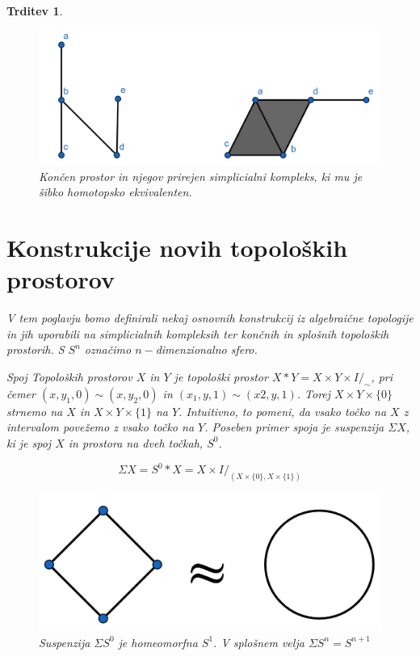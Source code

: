 \documentclass[a4paper,12pt]{article}
\theoremstyle{definition}
\theoremstyle{plain}
\theoremstyle{definition}
\theoremstyle{plain}
\newtheorem{trditev}{Trditev}
\theoremstyle{plain}
\theoremstyle{plain}
\theoremstyle{plain}
\begin{document}
\begin{trditev}
\begin{figure}[h]
    \centering
    \includegraphics[width=1\linewidth]{simp.png}
    \caption{Končen prostor in njegov prirejen simplicialni kompleks, ki mu je šibko homotopsko ekvivalenten.}
\end{figure}


\section{Konstrukcije novih topoloških prostorov}


V tem poglavju bomo definirali nekaj osnovnih konstrukcij iz algebraične topologije in jih uporabili na simplicialnih kompleksih ter končnih in splošnih topoloških prostorih. S $S^n$ označimo $n-$dimenzionalno sfero.

\textit{Spoj} Topoloških prostorov $X$ in $Y$ je topološki prostor $X\ast Y = X\times Y 
\times I /_{\sim}$, pri čemer $(x, y_1, 0) \sim (x, y_2, 0)$ in  $(x_1, y, 1) \sim (x2, y, 1)$. 
Torej $X\times Y\times \{0\}$ strnemo na $X$ in $X\times Y\times \{1\}$ na $Y$. Intuitivno, 
to pomeni, da vsako točko na $X$ z intervalom povežemo z vsako točko na $Y$.
Poseben primer spoja je \textit{suspenzija} $\Sigma X$, ki je spoj $X$ in prostora na dveh točkah, $S^0$.

$$
\Sigma X=S^0\ast X = X\times I /_{(X\times \{0\},X\times \{1\})}
$$

\begin{figure}[h]
    \centering
    \includegraphics[width=0.6\linewidth]{homeo2.png}
    \caption{Suspenzija $\Sigma S^0$ je homeomorfna $S^1$. V splošnem velja $\Sigma S^n=S^{n+1}$}
\end{figure}


\end{trditev}
\end{document}
